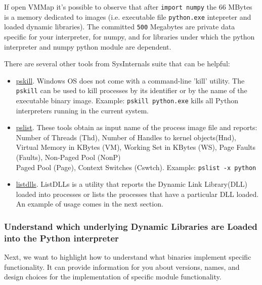 \documentclass[
]{article}
\begin{document}
If open VMMap it's possible to observe that after \texttt{import\ numpy}
the 66 MBytes is a memory dedicated to images (i.e. executable file
\texttt{python.exe} intepreter and loaded dynamic libraries). The
committed \texttt{500} Megabytes are private data specific for your
interpreter, for numpy, and for libraries under which the python
interpreter and numpy python module are dependent.

There are several other tools from SysInternals suite that can be
helpful:

\begin{itemize}
\item
  \href{https://learn.microsoft.com/en-us/sysinternals/downloads/pskill}{pskill}.
  Windows OS does not come with a command-line 'kill' utility. The
  \texttt{pskill} can be used to kill processes by its identifier or by
  the name of the executable binary image. Example:
  \texttt{pskill\ python.exe} kills all Python interpreters running in
  the current system.
\item
  \href{https://learn.microsoft.com/en-us/sysinternals/downloads/pslist}{pslist}.
  These tools obtain as input name of the process image file and
  reports:\\
  Number of Threads (Thd), Number of Handles to kernel objects(Hnd),
  Virtual Memory in KBytes (VM), Working Set in KBytes (WS), Page Faults
  (Faults), Non-Paged Pool (NonP)\\
  Paged Pool (Page), Context Switches (Cswtch). Example:
  \texttt{pslist\ -x\ python}
\item
  \href{https://learn.microsoft.com/en-us/sysinternals/downloads/listdlls}{listdlls}.
  ListDLLs is a utility that reports the Dynamic Link Library(DLL)
  loaded into processes or lists the processes that have a particular
  DLL loaded. An example of usage comes in the next section.
\end{itemize}

\hypertarget{understand-which-underlying-dynamic-libraries-are-loaded-into-the-python-interpreter}{%
\subsubsection{Understand which underlying Dynamic Libraries are Loaded
into the Python
interpreter}\label{understand-which-underlying-dynamic-libraries-are-loaded-into-the-python-interpreter}}

Next, we want to highlight how to understand what binaries implement
specific functionality. It can provide information for you about
versions, names, and design choices for the implementation of specific
module functionality.
\end{document}
